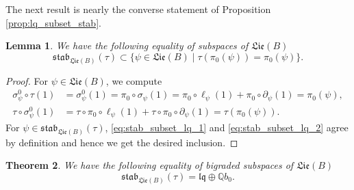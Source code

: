 \documentclass[11pt, a4paper]{amsart}
\newtheorem{theorem}{Theorem}[section]
\newtheorem{lemma}[theorem]{Lemma}
\numberwithin{equation}{section}
\theoremstyle{definition}
\newcommand{\Q}{\mathbb{Q}}
\newcommand{\lqq}{\mathfrak{lq}}
\newcommand{\Lie}{\mathfrak{Lie}}
\newcommand{\stab}{\mathfrak{stab}}
\begin{document}
The next result is nearly the converse statement of Proposition \ref{prop:lq_subset_stab}.

\begin{lemma} \label{lem:stab_subset_tau_inv}
We have the following equality of subspaces of $\Lie(B)$
\[
\stab_{\Lie(B)}(\tau)\subset\{\psi\in\Lie(B)\mid \tau(\pi_0(\psi))=\pi_0(\psi)\}.
\]
\end{lemma}
\begin{proof}
For $\psi\in\Lie(B)$, we compute
\begin{align}
\label{eq:stab_subset_lq_1}
\sigma_\psi^0\circ\tau(1)&=\sigma_\psi^0(1)=\pi_0\circ\sigma_\psi(1)=\pi_0\circ\ell_\psi(1)+\pi_0\circ\partial_\psi(1)=\pi_0(\psi),  \\
\label{eq:stab_subset_lq_2}
\tau\circ\sigma_\psi^0(1)&= \tau\circ\pi_0\circ\ell_\psi(1)+\tau\circ\pi_0\circ\partial_\psi(1)=\tau(\pi_0(\psi)).
\end{align}
For $\psi\in\stab_{\Lie(B)}(\tau)$, \eqref{eq:stab_subset_lq_1} and \eqref{eq:stab_subset_lq_2} agree by definition and hence we get the desired inclusion.
\end{proof}

\begin{theorem} \label{thm:stab_equal_lq} We have the following equality of bigraded subspaces of $\Lie(B)$
\[
\stab_{\Lie(B)}(\tau)=\lqq\oplus \Q b_0.
\]
\end{theorem}
\end{document}
